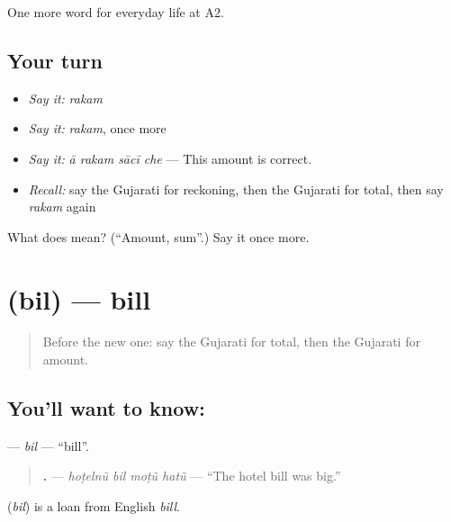 \begin{grammarlens}[title={What you've built}]
One more word for everyday life at A2.
\end{grammarlens}

\subsection*{Your turn}
\begin{itemize}
\raggedright
  \item \emph{Say it:} \emph{rakam}
  \item \emph{Say it:} \emph{rakam}, once more
  \item \emph{Say it:} \emph{ā rakam sācī che} — This amount is correct.
  \item \emph{Recall:} say the Gujarati for reckoning, then the Gujarati for total, then say \emph{rakam} again
\end{itemize}

\begin{tcolorbox}[breakable,colback=teal!4,colframe=teal!35!black,title={Before you move on}]
What does  mean? (\textquotedblleft{}Amount, sum\textquotedblright{}.) Say it once more.
\end{tcolorbox}
\section[\texorpdfstring{\gu{બિલ} (bil)}{બિલ (bil)}]{ (bil) — bill}

\label{lesson:GU-C192-bil}



\begin{quote}
Before the new one: say the Gujarati for total, then the Gujarati for amount.
\end{quote}

\subsection*{You'll want to know: }
\textbf{} — \emph{bil} — \textquotedblleft{}bill\textquotedblright{}.

\begin{quote}
\textbf{   .} — \emph{hoṭelnũ bil moṭũ hatũ} — \textquotedblleft{}The hotel bill was big.\textquotedblright{}
\end{quote}

\begin{cousinweb}
\textbf{} (\emph{bil}) is a loan from English \emph{bill}.
\end{cousinweb}

